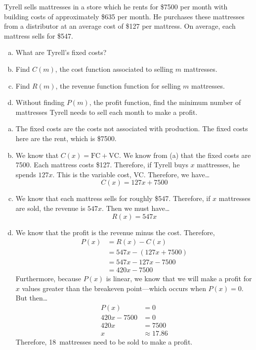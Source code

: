 \documentclass[11pt,letterpaper]{article}
\begin{document}

 Tyrell sells mattresses in a store which he rents for \$7500 per month with building costs of approximately \$635 per month. He purchases these mattresses from a distributor at an average cost of \$127 per mattress. On average, each mattress sells for \$547.
        \begin{enumerate}[(a)]
        \item What are Tyrell's fixed costs?
        \item Find $C(m)$, the cost function associated to selling $m$ mattresses. 
        \item Find $R(m)$, the revenue function function for selling $m$ mattresses. 
        \item Without finding $P(m)$, the profit function, find the minimum number of mattresses Tyrell needs to sell each month to make a profit. 
        \end{enumerate} \pspace

\sol
\begin{enumerate}[(a)]
\item The fixed costs are the costs not associated with production. The fixed costs here are the rent, which is \$7500. 

\item We know that $C(x)= \text{FC} + \text{VC}$. We know from (a) that the fixed costs are 7500. Each mattress costs \$127. Therefore, if Tyrell buys $x$ mattresses, he spends $127x$. This is the variable cost, VC. Therefore, we have\dots
	\[
	C(x)= 127x + 7500
	\]

\item We know that each mattress sells for roughly \$547. Therefore, if $x$ mattresses are sold, the revenue is $547x$. Then we must have\dots
	\[
	R(x)= 547x 
	\]

\item We know that the profit is the revenue minus the cost. Therefore,
	\[
	\begin{aligned}
	P(x)&= R(x) - C(x) \\[0.3cm]
	&= 547x - (127x + 7500) \\[0.3cm]
	&= 547x - 127x - 7500 \\[0.3cm]
	&= 420x - 7500
	\end{aligned}
	\]
Furthermore, because $P(x)$ is linear, we know that we will make a profit for $x$ values greater than the breakeven point---which occurs when $P(x)= 0$. But then\dots
	\[
	\begin{aligned}
	P(x)&= 0 \\[0.3cm]
	420x - 7500&= 0 \\[0.3cm]
	420x&= 7500 \\[0.3cm]
	x&\approx 17.86
	\end{aligned}
	\]
Therefore, 18~mattresses need to be sold to make a profit. 
\end{enumerate}
\end{document}
